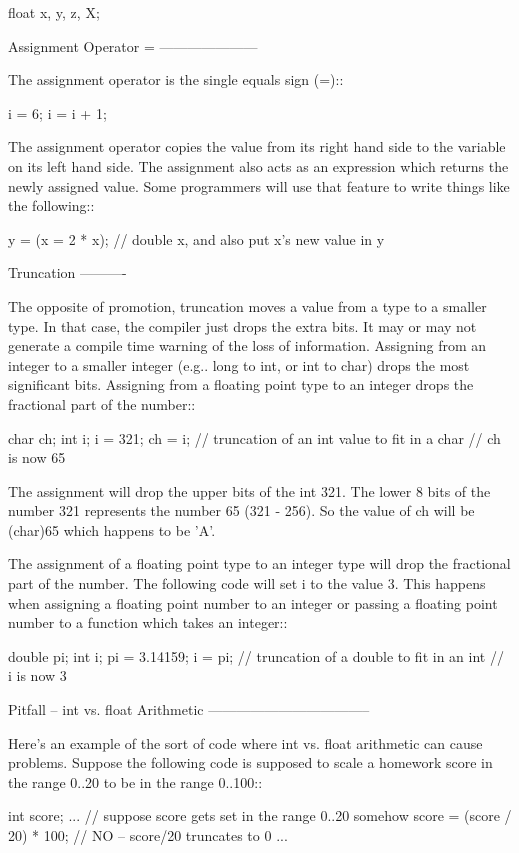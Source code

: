     float x, y, z, X;

Assignment Operator =
---------------------

The assignment operator is the single equals sign (=)::

    i = 6;
    i = i + 1;

The assignment operator copies the value from its right hand side to the variable on its left hand side. The assignment also acts as an expression which returns the newly assigned value. Some programmers will use that feature to write things like the following::

    y = (x = 2 * x);     // double x, and also put x's new value in y

Truncation
----------

The opposite of promotion, truncation moves a value from a type to a smaller type. In that case, the compiler just drops the extra bits. It may or may not generate a compile time warning of the loss of information. Assigning from an integer to a smaller integer (e.g.. long to int, or int to char) drops the most significant bits. Assigning from a floating point type to an integer drops the fractional part of the number::

    char ch;
    int i;
    i = 321;
    ch = i;     // truncation of an int value to fit in a char
    // ch is now 65

The assignment will drop the upper bits of the int 321. The lower 8 bits of the number 321 represents the number 65 (321 - 256). So the value of ch will be (char)65 which happens to be 'A'.

The assignment of a floating point type to an integer type will drop the fractional part of the number. The following code will set i to the value 3. This happens when assigning a floating point number to an integer or passing a floating point number to a function which takes an integer::

    double pi;
    int i;
    pi = 3.14159;
    i = pi;     // truncation of a double to fit in an int
    // i is now 3

Pitfall -- int vs. float Arithmetic
-----------------------------------

Here's an example of the sort of code where int vs. float arithmetic can cause problems. Suppose the following code is supposed to scale a homework score in the range 0..20 to be in the range 0..100::

    {
        int score;
        ...  // suppose score gets set in the range 0..20 somehow
        score = (score / 20) * 100;         // NO -- score/20 truncates to 0
        ...
    }


